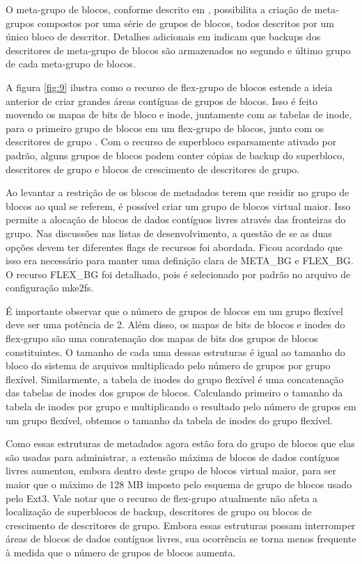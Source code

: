 \documentclass[
	12pt,				%
	openright,			%
	oneside,			%
	a4paper,			%
	chapter=TITLE,		%
	english,			%
	french,				%
	spanish,			%
	brazil				%
	]{abntex2}
\theoremstyle{definition}
\begin{document}
O meta-grupo de blocos, conforme descrito em \cite{ext2_ext3_extensions}, possibilita 
a criação de meta-grupos compostos por uma série de grupos de blocos, todos descritos 
por um único bloco de descritor. Detalhes adicionais em \cite{ext4_filesystem} indicam que 
backups dos descritores de meta-grupo de blocos são armazenados no segundo e último grupo de 
cada meta-grupo de blocos.

A figura \ref{fig:9} ilustra como o recurso de flex-grupo de blocos estende a ideia anterior de criar 
grandes áreas contíguas de grupos de blocos. Isso é feito movendo os mapas de bits de bloco e inode, 
juntamente com as tabelas de inode, para o primeiro grupo de blocos em um flex-grupo de blocos, 
junto com os descritores de grupo \cite{kumar}. Com o recurso de superbloco esparsamente ativado 
por padrão, alguns grupos de blocos podem conter cópias de backup do superbloco, descritores de 
grupo e blocos de crescimento de descritores de grupo.

Ao levantar a restrição de os blocos de metadados terem que residir no grupo de blocos ao qual se 
referem, é possível criar um grupo de blocos virtual maior. Isso permite a alocação de blocos de dados contíguos 
livres através das fronteiras do grupo. Nas discussões nas listas de desenvolvimento, a questão de se as duas 
opções devem ter diferentes flags de recursos foi abordada. Ficou acordado que isso era necessário para manter 
uma definição clara de META\_BG e FLEX\_BG. O recurso FLEX\_BG foi detalhado, pois é selecionado por padrão no 
arquivo de configuração mke2fs.

É importante observar que o número de grupos de blocos em um grupo flexível deve ser uma potência de 2. Além disso, 
os mapas de bits de blocos e inodes do flex-grupo são uma concatenação dos mapas de bits dos grupos de blocos 
constituintes. O tamanho de cada uma dessas estruturas é igual ao tamanho do bloco do sistema de arquivos multiplicado 
pelo número de grupos por grupo flexível. Similarmente, a tabela de inodes do grupo flexível é uma concatenação das 
tabelas de inodes dos grupos de blocos. Calculando primeiro o tamanho da tabela de inodes por grupo e multiplicando o 
resultado pelo número de grupos em um grupo flexível, obtemos o tamanho da tabela de inodes do grupo flexível.

Como essas estruturas de metadados agora estão fora do grupo de blocos que elas são usadas para administrar, 
a extensão máxima de blocos de dados contíguos livres aumentou, embora dentro deste grupo de blocos virtual maior, 
para ser maior que o máximo de 128 MB imposto pelo esquema de grupo de blocos usado pelo Ext3. Vale notar que o 
recurso de flex-grupo atualmente não afeta a localização de superblocos de backup, descritores de grupo ou 
blocos de crescimento de descritores de grupo. Embora essas estruturas possam interromper áreas de blocos 
de dados contíguos livres, sua ocorrência se torna menos frequente à medida que o número de grupos de blocos aumenta.
\end{document}
